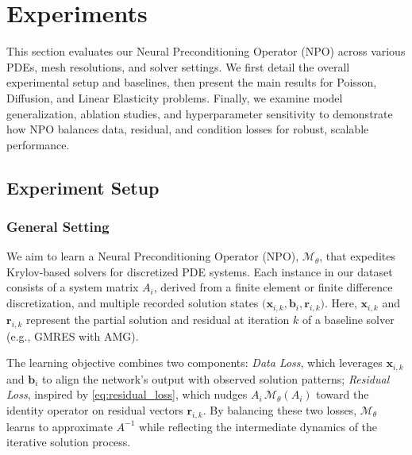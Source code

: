 

\section{Experiments}

This section evaluates our Neural Preconditioning Operator (NPO) across various PDEs, mesh resolutions, and solver settings. We first detail the overall experimental setup and baselines, then present the main results for Poisson, Diffusion, and Linear Elasticity problems. Finally, we examine model generalization, ablation studies, and hyperparameter sensitivity to demonstrate how NPO balances data, residual, and condition losses for robust, scalable performance.

\subsection{Experiment Setup}
\label{subsec:setup}
\subsubsection{General Setting}
We aim to learn a Neural Preconditioning Operator (NPO), \(\mathcal{M}_{\theta}\), that expedites Krylov-based solvers for discretized PDE systems. Each instance in our dataset consists of a system matrix \(A_{i}\), derived from a finite element or finite difference discretization, and multiple recorded solution states \(\bigl(\mathbf{x}_{i,k}, \mathbf{b}_{i}, \mathbf{r}_{i,k}\bigr)\). Here, \(\mathbf{x}_{i,k}\) and \(\mathbf{r}_{i,k}\) represent the partial solution and residual at iteration \(k\) of a baseline solver (e.g., GMRES with AMG). 

The learning objective combines two components: \emph{Data Loss}, which leverages \(\mathbf{x}_{i,k}\) and \(\mathbf{b}_{i}\) to align the network’s output with observed solution patterns; \emph{Residual Loss}, inspired by \eqref{eq:residual_loss}, which nudges \(A_{i}\,\mathcal{M}_{\theta}(A_{i})\) toward the identity operator on residual vectors \(\mathbf{r}_{i,k}\). By balancing these two losses, \(\mathcal{M}_{\theta}\) learns to approximate \(A^{-1}\) while reflecting the intermediate dynamics of the iterative solution process.

